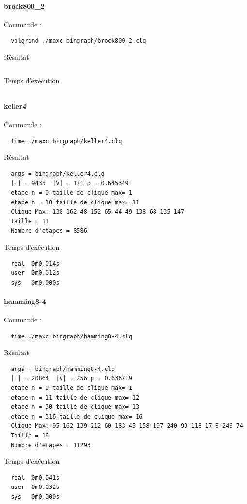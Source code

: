 \documentclass{article}
\begin{document}
\paragraph{brock800\_2}
Commande :
\begin{verbatim}
  valgrind ./maxc bingraph/brock800_2.clq
\end{verbatim}
Résultat
\begin{verbatim}

\end{verbatim}
Temps d'exécution
\begin{verbatim}

\end{verbatim}
\paragraph{keller4}
Commande :
\begin{verbatim}
  time ./maxc bingraph/keller4.clq
\end{verbatim}
Résultat
\begin{verbatim}
  args = bingraph/keller4.clq
  |E| = 9435  |V| = 171 p = 0.645349
  etape n = 0 taille de clique max= 1
  etape n = 10 taille de clique max= 11
  Clique Max: 130 162 48 152 65 44 49 138 68 135 147
  Taille = 11
  Nombre d'etapes = 8586
\end{verbatim}
Temps d'exécution
\begin{verbatim}
  real  0m0.014s
  user  0m0.012s
  sys   0m0.000s
\end{verbatim}
\paragraph{hamming8-4}
Commande :
\begin{verbatim}
  time ./maxc bingraph/hamming8-4.clq
\end{verbatim}
Résultat
\begin{verbatim}
  args = bingraph/hamming8-4.clq
  |E| = 20864  |V| = 256 p = 0.636719
  etape n = 0 taille de clique max= 1
  etape n = 11 taille de clique max= 12
  etape n = 30 taille de clique max= 13
  etape n = 316 taille de clique max= 16
  Clique Max: 95 162 139 212 60 183 45 158 197 240 99 118 17 8 249 74
  Taille = 16
  Nombre d'etapes = 11293
\end{verbatim}
Temps d'exécution
\begin{verbatim}
  real  0m0.041s
  user  0m0.032s
  sys   0m0.000s

\end{verbatim}
\end{document}
